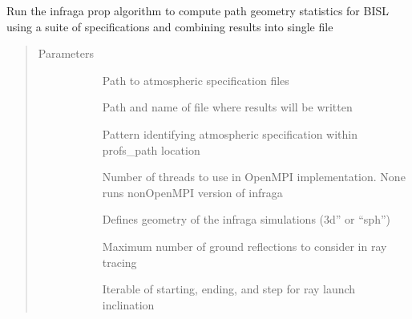 \documentclass[letterpaper,10pt,english]{sphinxmanual}
\begin{document}

\begin{fulllineitems}
\label{\detokenize{stochprop.propagation:stochprop.propagation.run_infraga}}
Run the infraga \sphinxhyphen{}prop algorithm to compute path geometry
statistics for BISL using a suite of specifications
and combining results into single file
\begin{quote}\begin{description}
\item[{Parameters}] \leavevmode\begin{description}
\item[{}] \leavevmode
Path to atmospheric specification files

\item[{}] \leavevmode
Path and name of file where results will be written

\item[{}] \leavevmode
Pattern identifying atmospheric specification within profs\_path location

\item[{}] \leavevmode
Number of threads to use in OpenMPI implementation.  None runs non\sphinxhyphen{}OpenMPI version of infraga

\item[{}] \leavevmode
Defines geometry of the infraga simulations (3d” or “sph”)

\item[{}] \leavevmode
Maximum number of ground reflections to consider in ray tracing

\item[{}] \leavevmode
Iterable of starting, ending, and step for ray launch inclination


\end{description}
\end{description}
\end{quote}
\end{fulllineitems}
\end{document}
